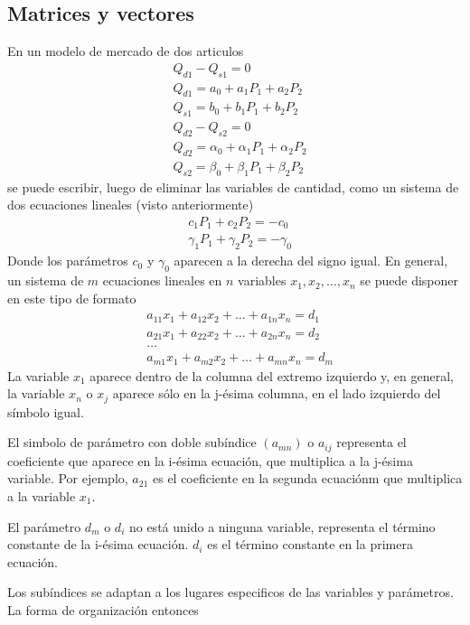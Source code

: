 \subsection{Matrices y vectores}

En un modelo de mercado de dos articulos 
$$
\begin{aligned}
& Q_{d1}-Q_{s1}=0 \\
& Q_{d1}=a_0+a_1P_1+a_2P_2 \\ 
& Q_{s1}=b_0+b_1P_1+b_2P_2 \\
& Q_{d2}-Q_{s2}=0 \\
& Q_{d2}=\alpha_0+\alpha_1P_1+\alpha_2P_2 \\
& Q_{s2}=\beta_0+\beta_1P_1+\beta_2P_2
\end{aligned}
$$
se puede escribir, luego de eliminar las variables de cantidad, como un sistema de dos ecuaciones lineales (visto anteriormente)
$$
\begin{aligned}
&c_1P_1+c_2P_2=-c_0 \\ 
&\gamma_1P_1+\gamma_2P_2=-\gamma_0
\end{aligned}
$$
Donde los parámetros \(c_0\) y \(\gamma_0\) aparecen a la derecha del signo igual. En general, un sistema de \(m\) ecuaciones lineales en \(n\) variables \(x_1,x_2,\dots,x_n\) se puede disponer en este tipo de formato
$$
\begin{aligned}
& a_{11}x_1+a_{12}x_2+\dots+a_{1n}x_n = d_1\\ 
& a_{21}x_1+a_{22}x_2+\dots+a_{2n}x_n = d_2 \\
& \dots \\
& a_{m1}x_1+a_{m2}x_2+\dots+a_{mn}x_n = d_m
\end{aligned}
$$
La variable \(x_1\) aparece dentro de la columna del extremo izquierdo y, en general, la variable \(x_n\) o \(x_j\) aparece sólo en la j-ésima columna, en el lado izquierdo del símbolo igual. 

El simbolo de parámetro con doble subíndice \((a_{mn})\) o \(a_{ij}\) representa el coeficiente que aparece en la i-ésima ecuación, que multiplica a la j-ésima variable. Por ejemplo, \(a_{21}\) es el coeficiente en la segunda ecuaciónm que multiplica a la variable \(x_1\). 

El parámetro \(d_m\) o \(d_i\) no está unido a ninguna variable, representa el término constante de la i-ésima ecuación. \(d_i\) es el término constante en la primera ecuación. 

Los subíndices se adaptan a los lugares especificos de las variables y parámetros. La forma de organización entonces


